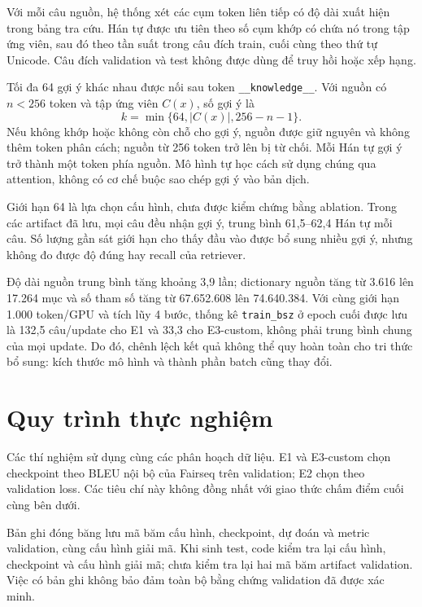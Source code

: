 \documentclass[11pt,twocolumn]{article}
\begin{document}
Với mỗi câu nguồn, hệ thống xét các cụm token liên tiếp có độ dài xuất hiện
trong bảng tra cứu. Hán tự được ưu tiên theo số cụm khớp có chứa nó trong
tập ứng viên, sau đó theo tần suất trong câu đích train, cuối cùng theo
thứ tự Unicode. Câu đích validation và test không được dùng để truy hồi
hoặc xếp hạng.

Tối đa 64 gợi ý khác nhau được nối sau token \texttt{\_\_knowledge\_\_}.
Với nguồn có $n<256$ token và tập ứng viên $C(x)$, số gợi ý là
\begin{equation}
k=\min\{64,|C(x)|,256-n-1\}.
\end{equation}
Nếu không khớp hoặc không còn chỗ cho gợi ý, nguồn được giữ nguyên và không
thêm token phân cách; nguồn từ 256 token trở lên bị từ chối.
Mỗi Hán tự gợi ý trở thành một token phía nguồn. Mô hình tự học cách sử dụng
chúng qua attention, không có cơ chế buộc sao chép gợi ý vào bản dịch.

Giới hạn 64 là lựa chọn cấu hình, chưa được kiểm chứng bằng ablation.
Trong các artifact đã lưu, mọi câu đều nhận gợi ý, trung bình
61,5--62,4 Hán tự mỗi câu. Số lượng gần sát giới hạn cho thấy đầu vào được
bổ sung nhiều gợi ý, nhưng không đo được độ đúng hay recall của retriever.

Độ dài nguồn trung bình tăng khoảng 3,9 lần; dictionary nguồn tăng từ
3.616 lên 17.264 mục và số tham số tăng từ 67.652.608 lên 74.640.384.
Với cùng giới hạn 1.000 token/GPU và tích lũy 4 bước, thống kê
\texttt{train\_bsz} ở epoch cuối được lưu là 132,5 câu/update cho E1
và 33,3 cho E3-custom, không phải trung bình chung của mọi update.
Do đó, chênh lệch kết quả không thể quy hoàn toàn cho tri thức bổ sung:
kích thước mô hình và thành phần batch cũng thay đổi.
\section{Quy trình thực nghiệm}

Các thí nghiệm sử dụng cùng các phân hoạch dữ liệu. E1 và E3-custom chọn
checkpoint theo BLEU nội bộ của Fairseq trên validation; E2 chọn theo
validation loss. Các tiêu chí này không đồng nhất với giao thức chấm điểm
cuối cùng bên dưới.

Bản ghi đóng băng lưu mã băm cấu hình, checkpoint, dự đoán và metric
validation, cùng cấu hình giải mã. Khi sinh test, code kiểm tra lại cấu hình,
checkpoint và cấu hình giải mã; chưa kiểm tra lại hai mã băm artifact
validation. Việc có bản ghi không bảo đảm toàn bộ bằng chứng validation
đã được xác minh.
\end{document}
